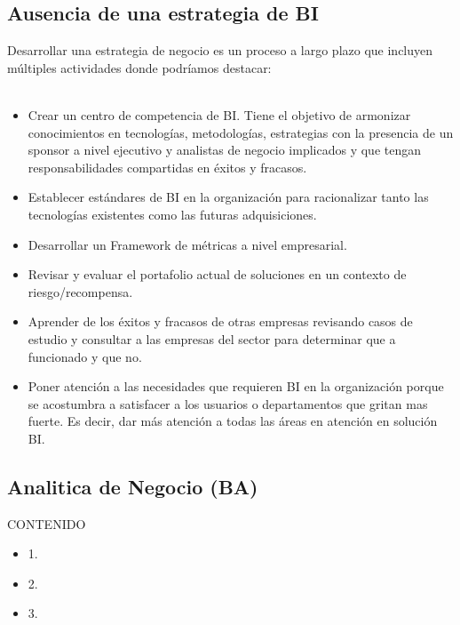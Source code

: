 \documentclass[preprint,12pt]{elsarticle}
\begin{document}
	\subsection{Ausencia de una estrategia de BI}
	Desarrollar una estrategia de negocio es un proceso a largo plazo que incluyen múltiples actividades donde podríamos destacar:
\\
\\
	\begin{itemize}
	\item Crear un centro de competencia de BI. Tiene el objetivo de armonizar conocimientos en tecnologías, metodologías, estrategias 
	con la presencia de un sponsor a nivel ejecutivo y analistas de negocio implicados y que tengan responsabilidades compartidas en 
	éxitos y fracasos.
	\item Establecer estándares de BI en la organización para racionalizar tanto las tecnologías existentes como las futuras adquisiciones.
	\item Desarrollar un Framework de métricas a nivel empresarial.
	\item Revisar y evaluar el portafolio actual de soluciones en un contexto de riesgo/recompensa.
	\item Aprender de los éxitos y fracasos de otras empresas revisando casos de estudio y consultar a las empresas del sector para 
	determinar que a funcionado y que no.
	\item Poner atención a las necesidades que requieren BI en la organización porque se acostumbra a satisfacer a los usuarios o 
	departamentos que gritan mas fuerte. Es decir, dar más atención a todas las áreas en atención en solución BI.
	
	\end{itemize}



	\subsection{Analitica de Negocio (BA) }
	CONTENIDO
	\begin{itemize}
	\item 1. 
	\item 2. 
	\item 3. 
	\end{itemize}



	
\end{document}
